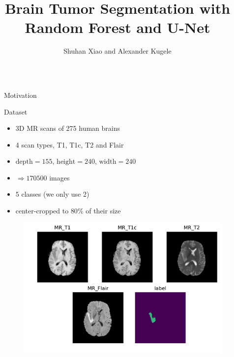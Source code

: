 \documentclass[final]{beamer}
\title{Brain Tumor Segmentation with Random Forest and U-Net} %
\author{Shuhan Xiao and Alexander Kugele} %
\institute{Heidelberg University} %
\newlength{\sepwid}
\newlength{\onecolwid}
\begin{document}

\setlength{\belowcaptionskip}{2ex} %
\setlength\belowdisplayshortskip{2ex} %

\begin{frame}[t] %

\begin{columns}[t] %

\begin{column}{\sepwid}\end{column} %

\begin{column}{\onecolwid} %

\begin{alertblock}{Motivation}
\end{alertblock}

\begin{alertblock}{Dataset}
\begin{itemize}[label={}]
\item 3D MR scans of 275 human brains
\item 4 scan types, T1, T1c, T2 and Flair
\item $\mathrm{depth}=155$, $\mathrm{height}=240$, $\mathrm{width}=240$
\item $\Rightarrow 170500$ images
\item 5 classes (we only use 2)
\item center-cropped to $80\%$ of their size
\end{itemize}
\begin{figure}
\centering
\includegraphics[width=0.9\linewidth]{scan_types_trans}
\end{figure}


\end{alertblock}
\end{column}
\end{columns}
\end{frame}
\end{document}
